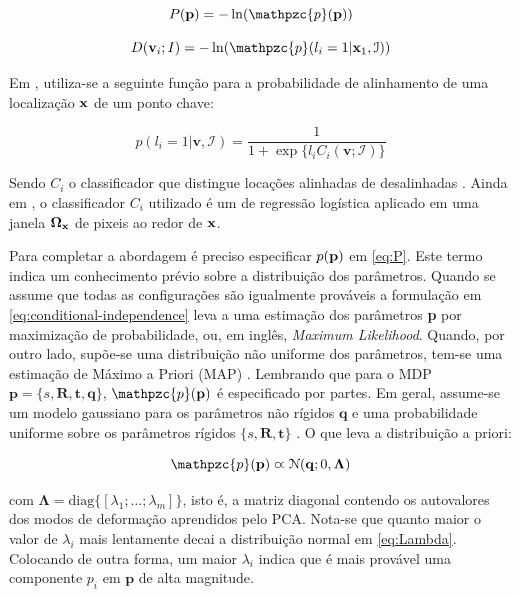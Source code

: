 {\begin{equation}
\label{eq:P}
P(\mathbf{p}) = 
-\ln
(
\mathpzc{p}(\mathbf{p})
)
\end{equation}

\begin{equation}
D(\mathbf{v}_i; I) =
-\ln
(
\mathpzc{p}(l_i=1 | \mathbf{x}_1, \mathcal{I})
)
\end{equation}

Em \cite{facetracker}, utiliza-se a seguinte função para a probabilidade de alinhamento de uma localização $\bf{x}$ de um ponto chave: 

\begin{equation}
p(l_i = 1|\textbf{v},\mathcal{I}) = \frac{1}{1 + \exp{\{}l_iC_i(\textbf{v};\mathcal{I}){\}}}
\label{eq:alg1}
\end{equation}

Sendo $C_i$ o classificador que distingue locações alinhadas de desalinhadas \cite{saragih2011deformable}. Ainda em \cite{facetracker}, o classificador $C_i$ utilizado é um de regressão logística aplicado em uma janela $\bf{\Omega_x}$ de pixeis ao redor de $\bf{x}$.

Para completar a abordagem é preciso especificar $p(\bf{p})$ em \ref{eq:P}. Este termo indica um conhecimento prévio sobre a distribuição dos parâmetros. Quando se assume que todas as configurações são igualmente prováveis a formulação em \ref{eq:conditional-independence}
 leva a uma estimação dos parâmetros \textbf{p} por maximização de probabilidade, ou, em inglês, \textit{Maximum Likelihood}. Quando, por outro lado, supõe-se uma distribuição não uniforme dos parâmetros, tem-se uma estimação de Máximo a Priori (MAP) \cite{saragih2011deformable}. Lembrando que para o MDP $\mathbf{p}=\{s,\mathbf{R},\mathbf{t},\mathbf{q}\}$, $\mathpzc{p}(\mathbf{p})$ é especificado por partes. Em geral, assume-se um modelo gaussiano para os parâmetros não rígidos $\mathbf{q}$ e uma probabilidade uniforme sobre os parâmetros rígidos $\{s,\mathbf{R},\mathbf{t}\}$ \cite{facetracker}. O que leva a distribuição a priori:

\begin{equation}
\mathpzc{p}(\mathbf{p}) \varpropto \mathcal{N}(\mathbf{q}; 0, \mathbf{\Lambda})
\label{eq:Lambda}
\end{equation}

com $\mathbf{\Lambda} = \text{diag}\{[ \lambda_1; \ldots; \lambda_m]\}$, isto é, a matriz diagonal contendo os autovalores dos modos de deformação aprendidos pelo PCA. Nota-se que quanto maior o valor de $\lambda_i$ mais lentamente decai a distribuição normal em \ref{eq:Lambda}. Colocando de outra forma, um maior $\lambda_i$ indica que é mais provável uma componente $p_i$ em $\mathbf{p}$ de alta magnitude.


}
